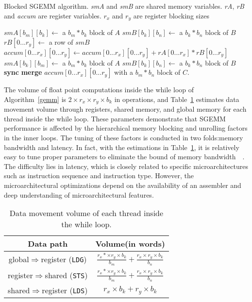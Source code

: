 \begin{algorithm}
  \caption{Blocked SGEMM algorithm. {\em smA} and {\em smB} are shared memory variables. {\em rA}, {\em rB} and {\em 
accum} are register variables. $r_x$ and $r_y$ are register blocking sizes}
  \label{gemm}
  \begin{algorithmic}[1]
	\State $smA[b_m][b_k] \gets$ a $b_m * b_k$ block of $A$
	\State $smB[b_k][b_n] \gets$ a $b_k * b_n$ block of $B$
	\Do
      \State {\color {black} {$rA[0...r_x]\gets$ a column of $smA$}}
	\State $rB[0...r_y]\gets$ a row of $smB$
	\State $accum[0...r_x][0...r_y]\gets accum[0...r_x][0...r_y]+rA[0...r_x]*rB[0...r_y]$
	\EndFor
	\State $smA[b_k][b_m]\gets$ a $b_m*b_k$ block of $A$
	\State $smB[b_k][b_n]\gets$ a $b_k*b_n$ block of $B$
	\State \textbf{sync}
	\State \textbf{merge} $accum[0...r_x][0...r_y]$ with a $b_m*b_n$ block of $C$.
  \end{algorithmic}
\end{algorithm}

The volume of float point computations inside the while loop of Algorithm~\ref{gemm} is $2\times r_x\times r_y \times b_k$ 
in operations, and Table~\ref{tab:dm} estimates data movement volume through registers, shared memory, and global 
memory for each thread inside the while loop.
These parameters demonstrate that SGEMM performance is affected by the hierarchical memory blocking and unrolling 
factors in the inner loops.
The tuning of these factors is conducted in two folds:memory bandwidth and latency. In fact, with the estimations in 
Table~\ref{tab:dm}, it is relatively easy to tune proper parameters to eliminate the bound of memory 
bandwidth~\cite{magma}~\cite{tan}. The difficulty lies in latency, which is closely related to specific 
microarchitectures such as instruction sequence and instruction type. However, the microarchitectural 
optimizations depend on the availability of an assembler and deep understanding of microarchitectural features.

\begin{table}[htbp]
    \caption{Data movement volume of each thread inside the while loop.} %
\centering
\scalebox{1.0} {
\begin{tabular}{|c|c|}
\hline
    Data path& Volume(in words)\\
\hline
    global$\Rightarrow$register ({\tt LDG})& $\frac{r_x*\times r_y \times b_k}{b_m} + \frac{r_x\times r_y \times b_k}{b_n}$ \\
\hline
register$\Rightarrow$shared ({\tt STS})& $\frac{r_x*\times r_y \times b_k}{b_m} + \frac{r_x\times r_y \times b_k}{b_n}$ \\
\hline
shared$\Rightarrow$register ({\tt LDS})& $r_x\times b_k + r_y\times b_k$\\
\hline
\end{tabular}
}
\label{tab:dm}
\end{table}
